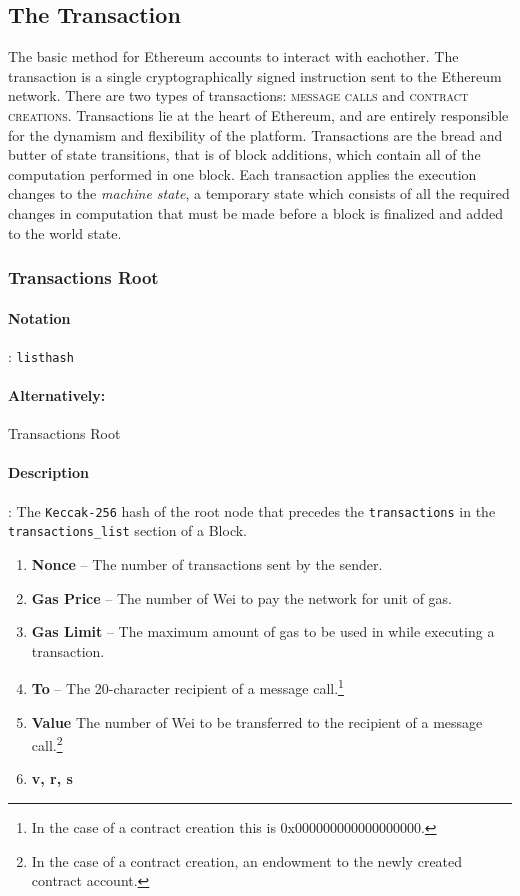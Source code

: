 \documentclass[10pt,letterpaper,leqno,bibliography=totoc]{scrartcl}
\newenvironment{alphafootnotes}
{\par\edef\savedfootnotenumber{\number\value{footnote}}
\renewcommand{\thefootnote}{\alph{footnote}}
\setcounter{footnote}{0}}
{\par\setcounter{footnote}{\savedfootnotenumber}}
\begin{document}
\begin{alphafootnotes}
\begin{multicols*}{2}
					\subsection{The Transaction}
	
			The basic method for Ethereum accounts to interact with eachother. The transaction is a single cryptographically signed instruction sent to the Ethereum network. There are two types of transactions: \textsc{message calls} and \textsc{contract creations}. Transactions lie at the heart of Ethereum, and are entirely responsible for the dynamism and flexibility of the platform. Transactions are the bread and butter of state transitions, that is of block additions, which contain all of the computation performed in one block. Each transaction applies the execution changes to the \textit{machine state}, a temporary state which consists of all the required changes in computation that must be made before a block is finalized and added to the world state.
		\subsubsection{Transactions Root}

			\paragraph{Notation}: \texttt{listhash}
			\paragraph{Alternatively:} Transactions Root
			\paragraph{Description}: The \texttt{Keccak-256} hash of the root node that precedes the \texttt{transactions} in the \texttt{transactions\_list} section of a Block.			
			
			\begin{enumerate}
				
				\item \textbf{Nonce} -- The number of transactions sent by the sender.
				\item \textbf{Gas Price} -- The number of Wei to pay the network for unit of gas.
				\item \textbf{Gas Limit} -- The maximum amount of gas to be used in while executing a transaction.			
				\item \textbf{To} -- The 20-character recipient of a message call.\footnote{In the case of a contract creation this is 0x000000000000000000.}
				\item \textbf{Value} The number of Wei to be transferred to the recipient of a message call.\footnote{In the case of a contract creation, an endowment to the newly created contract account.}
				\item \textbf{v, r, s} 
			\end{enumerate}
			

\end{multicols*}
\end{alphafootnotes}
\end{document}
